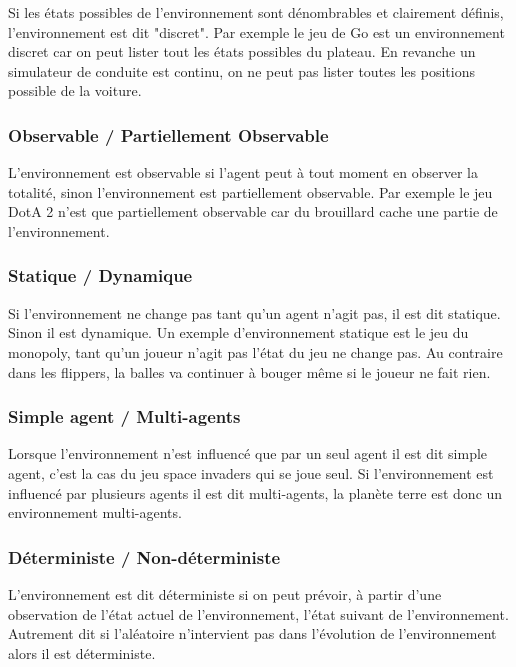 \documentclass{article}
\begin{document}
Si les états possibles de l'environnement sont dénombrables et clairement définis, l'environnement est dit "discret". Par exemple le jeu de Go est un environnement discret car on peut lister tout les états possibles du plateau. En revanche un simulateur de conduite est continu, on ne peut pas lister toutes les positions possible de la voiture.

\subsubsection{Observable / Partiellement Observable}

L'environnement est observable si l'agent peut à tout moment en observer la totalité, sinon l'environnement est partiellement observable. Par exemple le jeu DotA 2 n'est que partiellement observable car du brouillard cache une partie de l'environnement.

\subsubsection{Statique / Dynamique}

Si l'environnement ne change pas tant qu'un agent n'agit pas, il est dit statique. Sinon il est dynamique. Un exemple d'environnement statique est le jeu du monopoly, tant qu'un joueur n'agit pas l'état du jeu ne change pas. Au contraire dans les flippers, la balles va continuer à bouger même si le joueur ne fait rien.

\subsubsection{Simple agent / Multi-agents}

Lorsque l'environnement n'est influencé que par un seul agent il est dit simple agent, c'est la cas du jeu space invaders qui se joue seul. Si l'environnement est influencé par plusieurs agents il est dit multi-agents, la planète terre est donc un environnement multi-agents.

\subsubsection{Déterministe / Non-déterministe}

L'environnement est dit déterministe si on peut prévoir, à partir d'une observation de l'état actuel de l'environnement, l'état suivant de l'environnement. Autrement dit si l'aléatoire n'intervient pas dans l'évolution de l'environnement alors il est déterministe.
\end{document}

